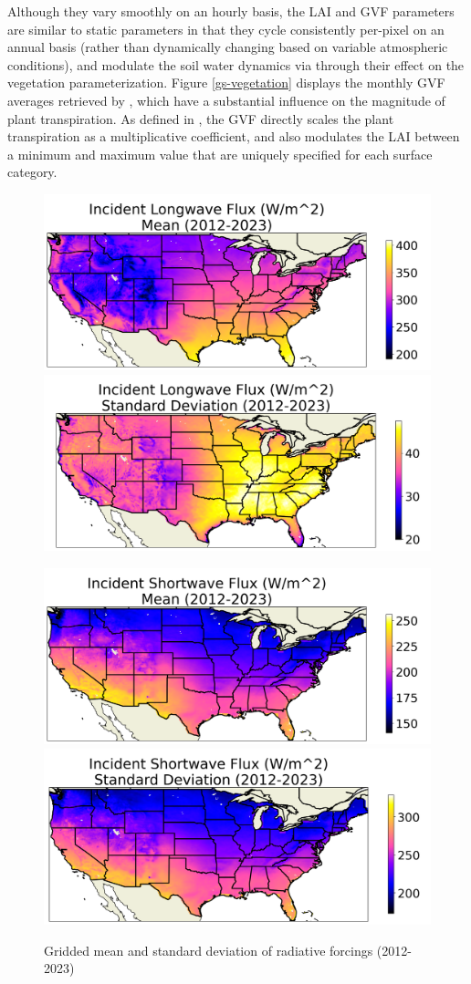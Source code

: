 Although they vary smoothly on an hourly basis, the LAI and GVF parameters are similar to static parameters in that they cycle consistently per-pixel on an annual basis (rather than dynamically changing based on variable atmospheric conditions), and modulate the soil water dynamics via through their effect on the vegetation parameterization. Figure \ref{gs-vegetation} displays the monthly GVF averages retrieved by \citep{gutman_derivation_1998}, which have a substantial influence on the magnitude of plant transpiration. As defined in \citep{wei_improvement_2011}, the GVF directly scales the plant transpiration as a multiplicative coefficient, and also modulates the LAI between a minimum and maximum value that are uniquely specified for each surface category.

\begin{figure}[h!]
    \centering
    \includegraphics[width=.48\linewidth,draft=false]{figures/thesis-gridstats/gridstat-bulk_dlwrf_2012-1_2023-12_y000-195_x000-462_mean.png}
    \includegraphics[width=.48\linewidth,draft=false]{figures/thesis-gridstats/gridstat-bulk_dlwrf_2012-1_2023-12_y000-195_x000-462_stdev.png}

    \includegraphics[width=.48\linewidth,draft=false]{figures/thesis-gridstats/gridstat-bulk_dswrf_2012-1_2023-12_y000-195_x000-462_mean.png}
    \includegraphics[width=.48\linewidth,draft=false]{figures/thesis-gridstats/gridstat-bulk_dswrf_2012-1_2023-12_y000-195_x000-462_stdev.png}
    \caption{Gridded mean and standard deviation of radiative forcings (2012-2023)}
    \label{gs-radiative}
\end{figure}

